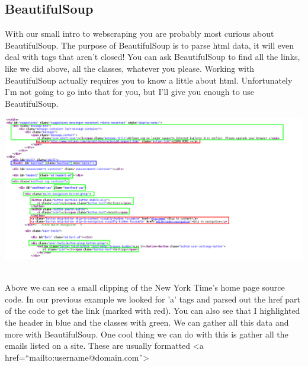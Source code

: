 \documentclass[11pt]{article}   %
\begin{document}
\subsection*{BeautifulSoup}
With our small intro to webscraping you are probably most curious about BeautifulSoup.  The purpose of BeautifulSoup is to parse html data, it will even deal with tags that aren't closed!  You can ask BeautifulSoup to find all the
links, like we did above, all the classes, whatever you please.  Working with BeautifulSoup actually requires you to know a little about html.  Unfortunately I'm not going to go into that for you, but I'll give you enough to use 
BeautifulSoup.\\

\begin{centering}
   \includegraphics[scale=0.5]{nytimes.png}
\end{centering}
\\
Above we can see a small clipping of the New York Time's home page source code.  In our previous example we looked for 'a' tags and parsed out the href part of the code to get the link (marked with red).  You can also see that I 
highlighted the header in blue and the classes with green.  We can gather all this data and more with BeautifulSoup.  One cool thing we can do with this is gather all the emails listed on a site.  These are usually formatted
<a href=``mailto:username@domain.com''>
\end{document}

